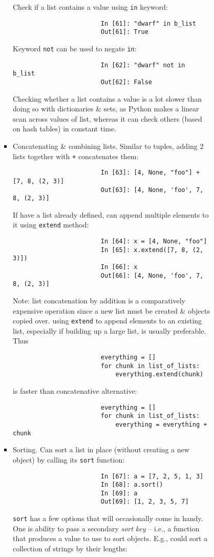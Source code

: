 \documentclass{article}
\begin{document}
\begin{enumerate}
\begin{itemize}
\begin{itemize}
\begin{itemize}
\begin{itemize}
					Check if a list contains a value using {\tt in} keyword:
					\begin{verbatim}
						In [61]: "dwarf" in b_list
						Out[61]: True
					\end{verbatim}
					Keyword {\tt not} can be used to negate {\tt in}:
					\begin{verbatim}
						In [62]: "dwarf" not in b_list
						Out[62]: False
					\end{verbatim}
					Checking whether a list contains a value is a lot slower than doing so with dictionaries \& sets, as Python makes a linear scan across values of list, whereas it can check others (based on hash tables) in constant time.
					\item {\sf Concatenating \& combining lists.} Similar to tuples, adding 2 lists together with {\tt+} concatenates them:
					\begin{verbatim}
						In [63]: [4, None, "foo"] + [7, 8, (2, 3)]
						Out[63]: [4, None, 'foo', 7, 8, (2, 3)]
					\end{verbatim}
					If have a list already defined, can append multiple elements to it using {\tt extend} method:
					\begin{verbatim}
						In [64]: x = [4, None, "foo"]
						In [65]: x.extend([7, 8, (2, 3)])
						In [66]: x
						Out[66]: [4, None, 'foo', 7, 8, (2, 3)]
					\end{verbatim}
					Note: list concatenation by addition is a comparatively expensive operation since a new list must be created \& objects copied over. using {\tt extend} to append elements to an existing list, especially if building up a large list, is usually preferable. Thus
					\begin{verbatim}
						everything = []
						for chunk in list_of_lists:
						    everything.extend(chunk)
					\end{verbatim}
					is faster than concatenative alternative:
					\begin{verbatim}
						everything = []
						for chunk in list_of_lists:
						    everything = everything + chunk
					\end{verbatim}
					\item {\sf Sorting.} Can sort a list in place (without creating a new object) by calling its {\tt sort} function:
					\begin{verbatim}
						In [67]: a = [7, 2, 5, 1, 3]
						In [68]: a.sort()
						In [69]: a
						Out[69]: [1, 2, 3, 5, 7]
					\end{verbatim}
					{\tt sort} has a few options that will occasionally come in handy. One is ability to pass a secondary {\it sort key} -- i.e., a function that produces a value to use to sort objects. E.g., could sort a collection of strings by their lengths:

\end{itemize}
\end{itemize}
\end{itemize}
\end{itemize}
\end{enumerate}
\end{document}
